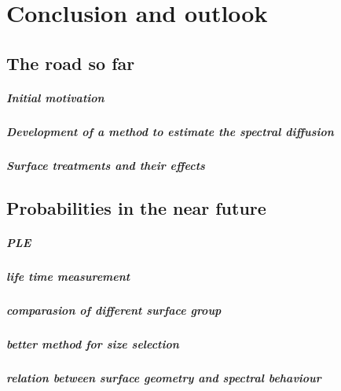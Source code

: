 \chapter{Conclusion and outlook} %

\label{Chapter3} %


\section{The road so far}

\paragraph{Initial motivation}

\paragraph{Development of a method to estimate the spectral diffusion}

\paragraph{Surface treatments and their effects}

\section{ Probabilities in the near future}

\paragraph{PLE}

\paragraph{life time measurement}

\paragraph{comparasion of different surface group}

\paragraph{better method for size selection}

\paragraph{relation between surface geometry and spectral behaviour}

